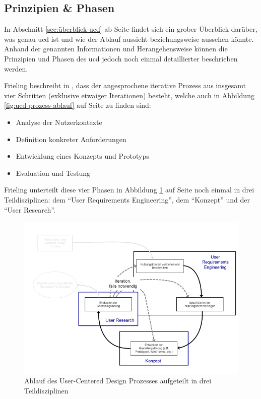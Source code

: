\documentclass[a4paper,12pt,twoside,numbers=noendperiod]{scrreprt}
\begin{document}
\subsection*{Prinzipien \& Phasen}
\label{sub-sec:prinzipien-phasen-ucd}

In Abschnitt \ref{sec:überblick-ucd} ab Seite \pageref{sec:überblick-ucd} findet sich ein grober Überblick darüber, was genau \acl{ucd} ist und wie der Ablauf aussieht beziehungsweise aussehen könnte. Anhand der genannten Informationen und Herangehensweise können die Prinzipien und Phasen des \ac{ucd} jedoch noch einmal detaillierter beschrieben werden.

Frieling beschreibt in \cite{frieling_user_2019}, dass der angesprochene iterative Prozess aus insgesamt vier Schritten (exklusive etwaiger Iterationen) besteht, welche auch in Abbildung \ref{fig:ucd-prozess-ablauf} auf Seite \pageref{fig:ucd-prozess-ablauf} zu finden sind:
\begin{itemize}
    \item Analyse der Nutzerkontexte
    \item Definition konkreter Anforderungen
    \item Entwicklung eines Konzepts und Prototyps
    \item Evaluation und Testung
\end{itemize}

Frieling unterteilt diese vier Phasen in Abbildung \ref{fig:ucd-prozess-teildisziplinen} auf Seite \pageref{fig:ucd-prozess-teildisziplinen} noch einmal in drei Teildisziplinen: dem \enquote{User Requirements Engineering}, dem \enquote{Konzept} und der \enquote{User Research}.

\begin{figure}[ht!]
    \centering
    \includegraphics[width=.75\linewidth]{thesis/images/Frieling_UCD-Prozess-Teildisziplinen.pdf}
    \caption[Ablauf des User-Centered Design Prozesses aufgeteilt in drei Teildisziplinen]{Ablauf des User-Centered Design Prozesses aufgeteilt in drei Teildisziplinen \cite{frieling_user_2019}}
    \label{fig:ucd-prozess-teildisziplinen}
\end{figure}
\end{document}
